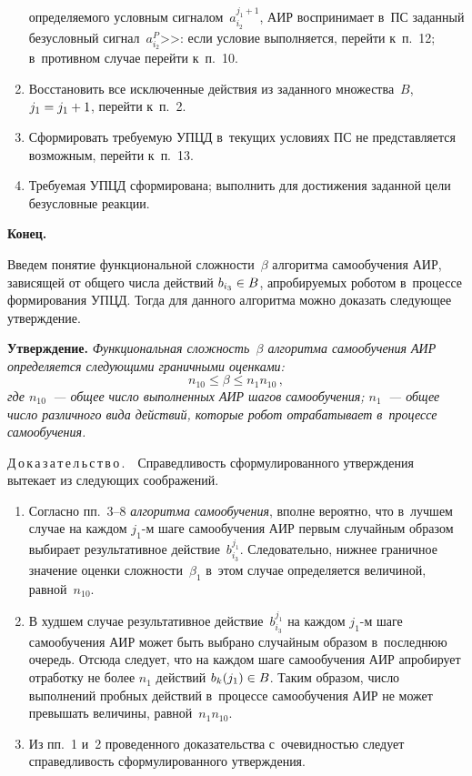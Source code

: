 \begin{multicols}{2}
\begin{enumerate}[1.]
опре\-де\-ля\-емо\-го условным сигналом~$a_{i_2}^{j_1+1}$, АИР воспринимает 
в~ПС заданный без\-услов\-ный сигнал~$a_{i_2}^P$>>: если 
условие выполняется, перейти к~п.~12; в~противном случае перейти к~п.~10.
  \item  Восстановить все исключенные действия из заданного множества~$B$, 
$j_1\hm= j_1\hm+1$, перейти к~п.~2.
  \item  Сформировать тре\-бу\-емую УПЦД в~текущих условиях ПС не 
пред\-став\-ля\-ет\-ся воз\-мож\-ным, перейти к~п.~13.
  \item  Требуемая УПЦД сформирована; выполнить для достижения заданной 
цели безуслов\-ные реакции.\\[-14pt]
  \end{enumerate}
  
 \noindent
  \textbf{Конец.}
  
  \smallskip
  
  Введем понятие функциональной слож\-ности~$\beta$ алгоритма 
са\-мо\-обуче\-ния АИР, зависящей от общего чис\-ла действий $b_{i_3}\hm\in B$, 
апробируемых роботом в~процессе формирования УПЦД. Тогда для данного алгоритма можно доказать 
сле\-ду\-ющее утверж\-де\-ние.
  
  \smallskip
  
  \noindent
  \textbf{Утверждение.} \textit{Функциональная слож\-ность~$\beta$ 
алгоритма са\-мо\-обуче\-ния АИР определяется сле\-ду\-ющи\-ми граничными 
оценками: 
  $$
  n_{10}\leq\beta\leq n_1 n_{10}\,,
  $$
где $n_{10}$~--- общее чис\-ло выполненных АИР шагов самообучения; $n_1$~--- 
общее чис\-ло различного вида действий, которые робот отрабатывает 
в~процессе са\-мо\-обуче\-ния.}

\smallskip

\noindent
  Д\,о\,к\,а\,з\,а\,т\,е\,л\,ь\,с\,т\,в\,о\,.\ \ Справедливость 
сформулированного утверж\-де\-ния вытекает из сле\-ду\-ющих соображений.
  \begin{enumerate}[1.]
  \item Согласно пп.~3--8 \textit{алгоритма са\-мо\-обуче\-ния}, впол\-не вероятно, 
что в~лучшем случае на каж\-дом $j_1$-м шаге самообучения АИР первым 
случайным образом выбирает результативное действие~$b_{i_3}^{j_1}$. 
Следовательно, ниж\-нее граничное значение оцен\-ки слож\-ности~$\beta_1$ 
в~этом случае определяется величиной, равной~$n_{10}$. 
  \item  В худшем случае результативное действие~$b_{i_3}^{j_1}$ на каж\-дом 
$j_1$-м шаге самообучения АИР может быть выбрано случайным образом 
в~последнюю очередь. Отсюда следует, что на каж\-дом шаге са\-мо\-обуче\-ния АИР 
апробирует отработку не более $n_1$ действий $b_k(j_1)\hm\in B$. Таким 
образом, число выполнений проб\-ных действий в~процессе са\-мо\-обуче\-ния АИР 
не может превышать величины, рав\-ной~$n_1 n_{10}$.
  \item Из пп.~1 и~2 проведенного доказательства с~оче\-вид\-ностью следует 
спра\-вед\-ли\-вость сформулированного утверж\-де\-ния. 
  \end{enumerate}
  

\end{multicols}

